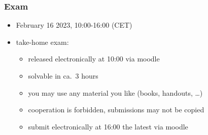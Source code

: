 \documentclass[fleqn,10pt,serif,xcolor=svgnames,xcolor=table,aspectratio=169,handout]{beamer}
\begin{document}
\begin{frame}
  \frametitle{Exam}
  \begin{itemize}
    \item February 16 2023, 10:00-16:00 (CET)
    \item take-home exam:
    \begin{itemize}
      \item released electronically at 10:00 via moodle
      \item solvable in ca.~3 hours
      \item you may use any material you like (books, handouts, \dots)
      \item cooperation is forbidden, submissions may not be copied
      \item submit electronically at 16:00 the latest via moodle
    \end{itemize}
  \end{itemize}
\end{frame}
\end{document}
